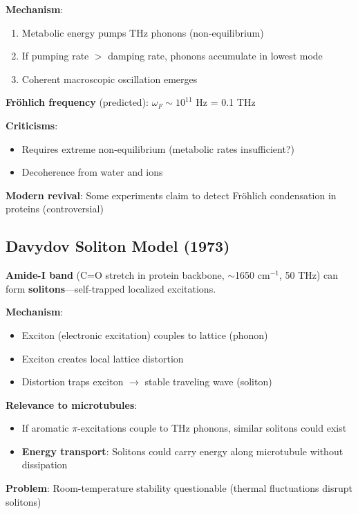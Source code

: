 \textbf{Mechanism}:
\begin{enumerate}
\item Metabolic energy pumps THz phonons (non-equilibrium)
\item If pumping rate $>$ damping rate, phonons accumulate in lowest mode
\item Coherent macroscopic oscillation emerges
\end{enumerate}

\textbf{Fröhlich frequency} (predicted): $\omega_F \sim 10^{11}$ Hz = 0.1 THz

\textbf{Criticisms}:
\begin{itemize}
\item Requires extreme non-equilibrium (metabolic rates insufficient?)
\item Decoherence from water and ions
\end{itemize}

\textbf{Modern revival}: Some experiments claim to detect Fröhlich
condensation in proteins (controversial)

\subsection{Davydov Soliton Model (1973)}\label{davydov-soliton-model-1973}

\textbf{Amide-I band} (C=O stretch in protein backbone, $\sim$1650 cm$^{-1}$, 50 THz) can form \textbf{solitons}---self-trapped localized excitations.

\textbf{Mechanism}:
\begin{itemize}
\item Exciton (electronic excitation) couples to lattice (phonon)
\item Exciton creates local lattice distortion
\item Distortion traps exciton $\rightarrow$ stable traveling wave (soliton)
\end{itemize}

\textbf{Relevance to microtubules}:
\begin{itemize}
\item If aromatic $\pi$-excitations couple to THz phonons, similar solitons could exist
\item \textbf{Energy transport}: Solitons could carry energy along microtubule without dissipation
\end{itemize}

\textbf{Problem}: Room-temperature stability questionable (thermal
fluctuations disrupt solitons)

